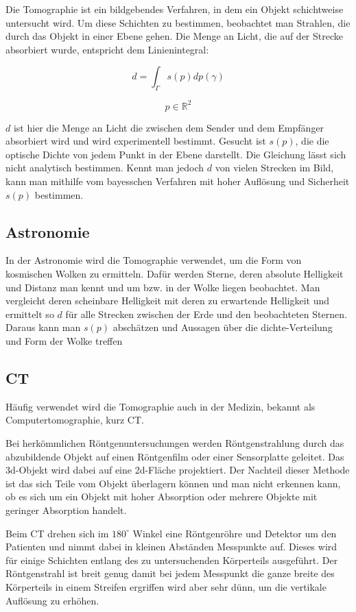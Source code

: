 \documentclass[]{dsadokumentation}
\begin{document}
Die Tomographie ist ein bildgebendes Verfahren, in dem ein Objekt schichtweise untersucht wird. Um diese Schichten zu bestimmen, beobachtet man Strahlen, die durch das Objekt in einer Ebene gehen. Die Menge an Licht, die auf der Strecke absorbiert wurde, entspricht dem Linienintegral:

$$d=\int_{\Gamma}{}s(p)dp(\gamma)$$

$$p\in \mathbb{R}^2$$

$d$ ist hier die Menge an Licht die zwischen dem Sender und dem Empfänger absorbiert wird und wird experimentell bestimmt. Gesucht ist $s(p)$, die die optische Dichte von jedem Punkt in der Ebene darstellt. Die Gleichung lässt sich nicht analytisch bestimmen. Kennt man jedoch $d$ von vielen Strecken im Bild, kann man mithilfe vom bayesschen Verfahren mit hoher Auflösung und Sicherheit $s(p)$ bestimmen.

\subsection{Astronomie}

In der Astronomie wird die Tomographie verwendet, um die Form von kosmischen Wolken zu ermitteln. Dafür werden Sterne, deren absolute Helligkeit und Distanz man kennt und um bzw. in der Wolke liegen beobachtet. Man vergleicht deren scheinbare Helligkeit mit deren zu erwartende Helligkeit und ermittelt so $d$ für alle Strecken zwischen der Erde und den beobachteten Sternen. Daraus kann man $s(p)$ abschätzen und Aussagen über die dichte-Verteilung und Form der Wolke treffen

\subsection{CT}

Häufig verwendet wird die Tomographie auch in der Medizin, bekannt als Computertomographie, kurz CT.

Bei herkömmlichen Röntgenuntersuchungen werden Röntgenstrahlung durch das abzubildende Objekt auf einen Röntgenfilm oder einer Sensorplatte geleitet. Das 3d-Objekt wird dabei auf eine 2d-Fläche projektiert. Der Nachteil dieser Methode ist das sich Teile vom Objekt überlagern können und man nicht erkennen kann, ob es sich um ein Objekt mit hoher Absorption oder mehrere Objekte mit geringer Absorption handelt.

Beim CT drehen sich im $180^\circ$ Winkel eine Röntgenröhre und Detektor um den Patienten und nimmt dabei in kleinen Abständen Messpunkte auf. Dieses wird für einige Schichten entlang des zu untersuchenden Körperteils ausgeführt. Der Röntgenstrahl ist breit genug damit bei jedem Messpunkt die ganze breite des Körperteils in einem Streifen ergriffen wird aber sehr dünn, um die vertikale Auflösung zu erhöhen.
\end{document}

